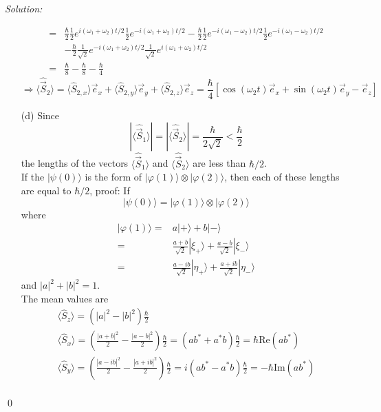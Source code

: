 \documentclass[12pt,a4paper]{article}
\newenvironment{sol}
    {\emph{Solution:}
    }
    {
    \qed
    }
\begin{document}
\begin{sol}
\begin{itemize}
\begin{align}
\nonumber=&\frac{\hbar}{2}\frac{1}{2}e^{i(\omega_1+\omega_2)t/2}\frac{1}{2}e^{-i(\omega_1+\omega_2)t/2}-\frac{\hbar}{2}\frac{1}{2}e^{-i(\omega_1-\omega_2)t/2}\frac{1}{2}e^{-i(\omega_1-\omega_2)t/2}\\
\nonumber&-\frac{\hbar}{2}\frac{1}{\sqrt{2}}e^{-i(\omega_1+\omega_2)t/2}\frac{1}{\sqrt{2}}e^{i(\omega_1+\omega_2)t/2}\\
=&\frac{\hbar}{8}-\frac{\hbar}{8}-\frac{\hbar}{4}
\end{align}
\begin{equation}
\Longrightarrow\langle\hat{\vec{S}}_2\rangle=\langle\hat{S}_{2,x}\rangle\vec{e}_x+\langle\hat{S}_{2,y}\rangle\vec{e}_y+\langle\hat{S}_{2,z}\rangle\vec{e}_z=\frac{\hbar}{4}[\cos(\omega_2t)\vec{e}_x+\sin(\omega_2t)\vec{e}_y-\vec{e}_z]
\end{equation}
\item[(d)] Since
\begin{equation}
|\langle\hat{\vec{S}}_1\rangle|=|\langle\hat{\vec{S}}_2\rangle|=\frac{\hbar}{2\sqrt{2}}<\frac{\hbar}{2}
\end{equation}
the lengths of the vectors $\langle\hat{\vec{S}}_1\rangle$ and $\langle\hat{\vec{S}}_2\rangle$ are less than $\hbar/2$.\\
If the $|\psi(0)\rangle$ is the form of $|\varphi(1)\rangle\otimes|\varphi(2)\rangle$, then each of these lengths are equal to $\hbar/2$, proof:
If
\begin{equation}
|\psi(0)\rangle=|\varphi(1)\rangle\otimes|\varphi(2)\rangle
\end{equation}
where
\begin{align}
\nonumber|\varphi(1)\rangle=&a|+\rangle+b|-\rangle\\
\nonumber=&\frac{a+b}{\sqrt{2}}|\xi_+\rangle+\frac{a-b}{\sqrt{2}}|\xi_-\rangle\\
=&\frac{a-ib}{\sqrt{2}}|\eta_+\rangle+\frac{a+ib}{\sqrt{2}}|\eta_-\rangle
\end{align}
and $|a|^2+|b|^2=1$.\\
The mean values are
\begin{gather}
\langle\hat{S}_z\rangle=(|a|^2-|b|^2)\frac{\hbar}{2}\\
\langle\hat{S}_x\rangle=(\frac{|a+b|^2}{2}-\frac{|a-b|^2}{2})\frac{\hbar}{2}=(ab^*+a^*b)\frac{\hbar}{2}=\hbar\text{Re}(ab^*)\\
\langle\hat{S}_y\rangle=(\frac{|a-ib|^2}{2}-\frac{|a+ib|^2}{2})\frac{\hbar}{2}=i(ab^*-a^*b)\frac{\hbar}{2}=-\hbar\text{Im}(ab^*)
\end{gather}
\begin{gather}

\end{gather}
\end{itemize}
\end{sol}
\end{document}
